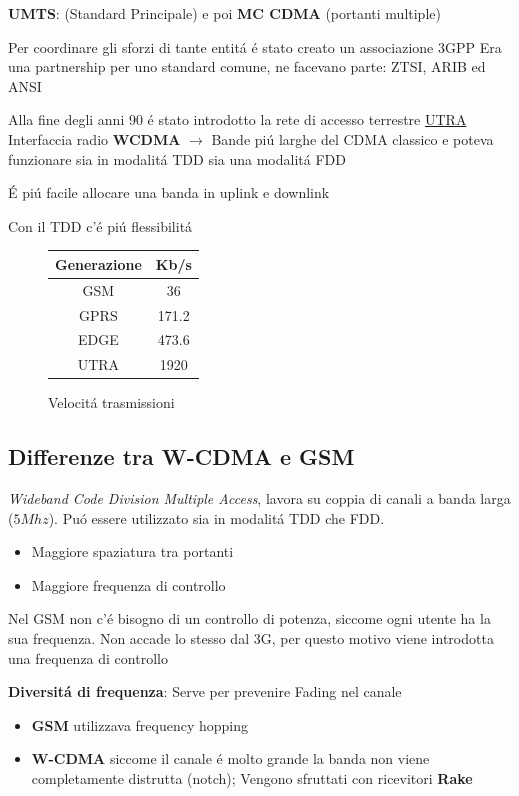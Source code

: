 \documentclass{article}
\begin{document}
\textbf{UMTS}: (Standard Principale) e poi \textbf{MC CDMA} (portanti multiple)


Per coordinare gli sforzi di tante entit\'a \'e stato creato un associazione 3GPP
Era una partnership per uno standard comune, ne facevano parte: ZTSI, ARIB ed ANSI

Alla fine degli anni 90 \'e stato introdotto la rete di accesso terrestre \underline{UTRA}
Interfaccia radio \textbf{WCDMA} $\rightarrow$ Bande pi\'u larghe del CDMA classico e  poteva funzionare sia in modalit\'a TDD sia una modalit\'a FDD

\'E pi\'u facile allocare una banda in uplink e downlink

Con il TDD c'\'e pi\'u flessibilit\'a

\begin{figure}
\begin{tabular}{c c}
    Generazione & Kb/s\\
    \hline
    GSM & 36\\
    GPRS &171.2\\
    EDGE &473.6\\
    UTRA &1920\\
\end{tabular}
\centering
\caption{Velocit\'a trasmissioni}
\end{figure}


\subsection{Differenze tra W-CDMA e GSM }
\textit{Wideband Code Division Multiple Access}, lavora su coppia di canali a banda larga ($5Mhz$). Pu\'o essere utilizzato sia in modalit\'a TDD che FDD.
\begin{itemize}
    \item Maggiore spaziatura tra portanti
    \item Maggiore frequenza di controllo

\end{itemize}

Nel GSM non c'\'e bisogno di un controllo di potenza, siccome ogni utente ha la sua frequenza. Non accade lo stesso dal 3G, per questo motivo viene introdotta una frequenza di controllo

\textbf{Diversit\'a di frequenza}: Serve per prevenire Fading nel canale
\begin{itemize}
    \item \textbf{GSM} utilizzava frequency hopping
    \item \textbf{W-CDMA} siccome il canale \'e molto grande la banda non viene completamente distrutta (notch); Vengono sfruttati con ricevitori \textbf{Rake}
\end{itemize}
\end{document}
